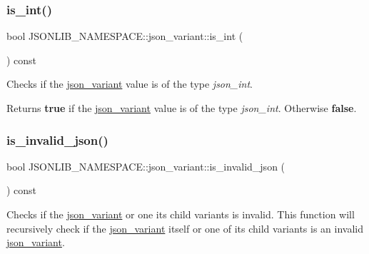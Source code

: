 \subsubsection{\texorpdfstring{is\+\_\+int()}{is\_int()}\hspace{0.1cm}{\footnotesize\ttfamily [2/2]}}
{\footnotesize\ttfamily bool J\+S\+O\+N\+L\+I\+B\+\_\+\+N\+A\+M\+E\+S\+P\+A\+C\+E\+::json\+\_\+variant\+::is\+\_\+int (\begin{DoxyParamCaption}{ }\end{DoxyParamCaption}) const}



Checks if the \hyperlink{classJSONLIB__NAMESPACE_1_1json__variant}{json\+\_\+variant} value is of the type {\itshape json\+\_\+int}. 

\begin{DoxyReturn}{Returns}
{\bfseries true} if the \hyperlink{classJSONLIB__NAMESPACE_1_1json__variant}{json\+\_\+variant} value is of the type {\itshape json\+\_\+int}. Otherwise {\bfseries false}. 
\end{DoxyReturn}
\mbox{\label{classJSONLIB__NAMESPACE_1_1json__variant_a1a08b35da4cf3a334d32ebb81b20c08a}} 
\subsubsection{\texorpdfstring{is\+\_\+invalid\+\_\+json()}{is\_invalid\_json()}\hspace{0.1cm}{\footnotesize\ttfamily [1/2]}}
{\footnotesize\ttfamily bool J\+S\+O\+N\+L\+I\+B\+\_\+\+N\+A\+M\+E\+S\+P\+A\+C\+E\+::json\+\_\+variant\+::is\+\_\+invalid\+\_\+json (\begin{DoxyParamCaption}{ }\end{DoxyParamCaption}) const}



Checks if the \hyperlink{classJSONLIB__NAMESPACE_1_1json__variant}{json\+\_\+variant} or one its child variants is invalid. This function will recursively check if the \hyperlink{classJSONLIB__NAMESPACE_1_1json__variant}{json\+\_\+variant} itself or one of its child variants is an invalid \hyperlink{classJSONLIB__NAMESPACE_1_1json__variant}{json\+\_\+variant}. 

